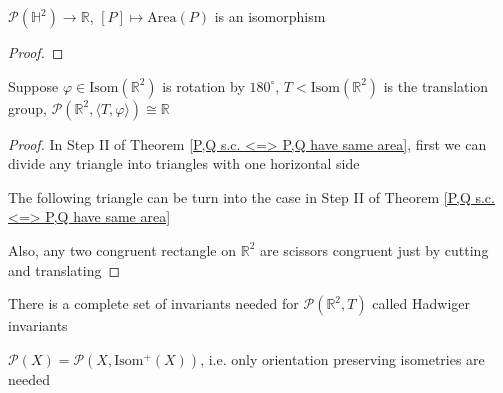\documentclass[../main.tex]{subfiles}
\begin{document}
\begin{theorem}
$\mathcal P(\mathbb H^2)\to\mathbb R$, $[P]\mapsto \mathrm{Area}(P)$ is an isomorphism
\end{theorem}

\begin{proof}

\end{proof}

\begin{theorem}
Suppose $\varphi\in\mathrm{Isom(\mathbb R^2)}$ is rotation by $180^\circ$, $T<\mathrm{Isom(\mathbb R^2)}$ is the translation group, $\mathcal P(\mathbb R^2,\langle T,\varphi\rangle)\cong\mathbb R$
\end{theorem}

\begin{proof}
In Step II of Theorem \ref{P,Q s.c. <=> P,Q have same area}, first we can divide any triangle into triangles with one horizontal side
\begin{center}
\end{center}
The following triangle can be turn into the case in Step II of Theorem \ref{P,Q s.c. <=> P,Q have same area}
\begin{center}
\end{center}
Also, any two congruent rectangle on $\mathbb R^2$ are scissors congruent just by cutting and translating
\end{proof}

\begin{remark}
There is a complete set of invariants needed for $\mathcal P(\mathbb R^2,T)$ called Hadwiger invariants
\end{remark}

\begin{theorem}
$\mathcal P(X)=\mathcal P(X,\mathrm{Isom^+}(X))$, i.e. only orientation preserving isometries are needed
\end{theorem}
\end{document}
